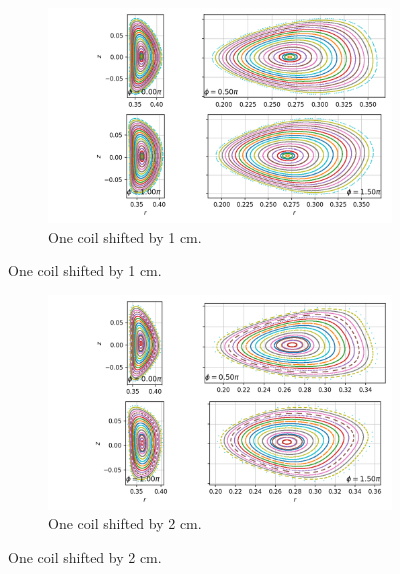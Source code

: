 \begin{figure}[H]
\ContinuedFloat
\captionsetup[subfigure]{justification=centering}
\begin{subfigure}{1.0\textwidth}
\centering
\includegraphics[scale=0.7]{Images/03_Design/1cm.png}
\caption{One coil shifted by 1 cm.}
\label{fig:1cm_shifted}
\end{subfigure}
\end{figure}

\begin{figure}[H]
\captionsetup[subfigure]{justification=centering}
\ContinuedFloat
\begin{subfigure}{1.0\textwidth}
\centering
\includegraphics[scale=0.7]{Images/03_Design/2cm.png}
\caption{One coil shifted by 2 cm.}
\label{fig:2cm_shifted}
\end{subfigure}
\end{figure}

